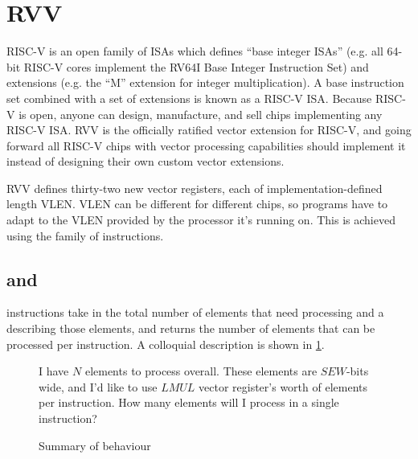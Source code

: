 \section{RVV}\label{chap:bg:sec:rvv}
RISC-V is an open family of ISAs which defines ``base integer ISAs'' (e.g. all 64-bit RISC-V cores implement the RV64I Base Integer Instruction Set) and extensions (e.g. the ``M'' extension for integer multiplication).
A base instruction set combined with a set of extensions is known as a RISC-V ISA.
Because RISC-V is open, anyone can design, manufacture, and sell chips implementing any RISC-V ISA.
RVV is the officially ratified vector extension for RISC-V, and going forward all RISC-V chips with vector processing capabilities should implement it instead of designing their own custom vector extensions.

RVV defines thirty-two new vector registers, each of implementation-defined length VLEN.
VLEN can be different for different chips, so programs have to adapt to the VLEN provided by the processor it's running on.
This is achieved using the  family of instructions.

\subsection{ and }
 instructions take in the total number of elements that need processing and a  describing those elements, and returns the number of elements that can be processed per instruction.
A colloquial description is shown in \cref{fig:vsetvl}.

\begin{figure}
    \centering
    \begin{displayquote}
    I have $N$ elements to process overall.
    These elements are $SEW$-bits wide, and I'd like to use $LMUL$ vector register's worth of elements per instruction.
    How many elements will I process in a single instruction?
    \end{displayquote}
    \caption{Summary of  behaviour}
    \label{fig:vsetvl}
\end{figure}


